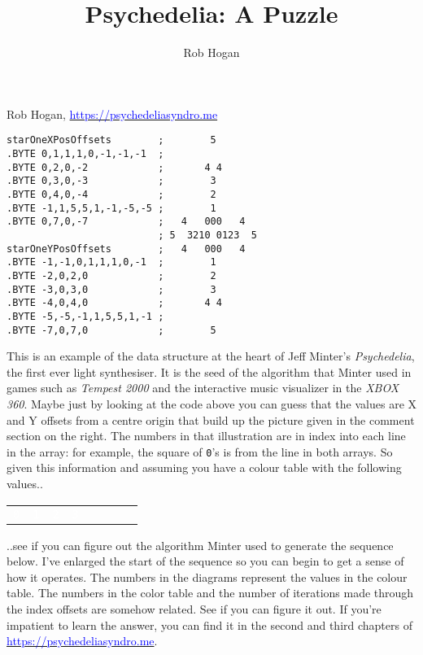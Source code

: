 \documentclass[pagedoutpaper,twocolumn,9pt]{pagedout}
\title{Psychedelia: A Puzzle}
\author{Rob Hogan}
\makeatletter
\newcommand*{\icode}[1]{{\texttt{#1}}}
\renewcommand{\maketitle}{
\begin{flushleft}
{\noindent\Huge\bf\@title}\break
\end{flushleft}
}
\makeatother
\begin{document}
    
\maketitle
\vspace{-0.8cm}
Rob Hogan, \href{https://github.com/mwenge/tempest}{\textcolor{blue}{https://psychedeliasyndro.me}}
\begin{lstlisting}[basicstyle=\ttfamily\small]
starOneXPosOffsets        ;        5       
.BYTE 0,1,1,1,0,-1,-1,-1  ;                
.BYTE 0,2,0,-2            ;       4 4                                       
.BYTE 0,3,0,-3            ;        3                                        
.BYTE 0,4,0,-4            ;        2                                        
.BYTE -1,1,5,5,1,-1,-5,-5 ;        1       
.BYTE 0,7,0,-7            ;   4   000   4                                   
                          ; 5  3210 0123  5                  
starOneYPosOffsets        ;   4   000   4  
.BYTE -1,-1,0,1,1,1,0,-1  ;        1                                        
.BYTE -2,0,2,0            ;        2                                        
.BYTE -3,0,3,0            ;        3                                        
.BYTE -4,0,4,0            ;       4 4      
.BYTE -5,-5,-1,1,5,5,1,-1 ;                                                 
.BYTE -7,0,7,0            ;        5       
\end{lstlisting}   
This is an example of the data structure at the heart of Jeff Minter's \textit{Psychedelia}, the
first ever light synthesiser. It is the seed of the algorithm that Minter used in games such as
\textit{Tempest 2000} and the interactive music visualizer in the \textit{XBOX 360}. Maybe just
by looking at the code above you can guess that the values are X and Y offsets from a centre origin
that build up the picture given in the comment section on the right. The numbers in that illustration
are in index into each line in the array: for example, the square of \icode{0}'s is from the line in
both arrays. So given this information and assuming you have a colour table with the following values..
\begin{adjustbox}{width=5cm,center}
  \begin{tabular}{cccccccc}
    \cellcolor[HTML]{000000}\textcolor{white}{\icode{0}} & \cellcolor{c64_blue}\textcolor{white}{\icode{1}} &
    \cellcolor{c64_red}\textcolor{white}{\icode{2}} & \cellcolor{c64_purple}\textcolor{white}{\icode{3}} &
    \cellcolor{c64_green}\icode{4} & \cellcolor{c64_cyan}\icode{5} &
    \cellcolor{c64_yellow}\icode{6} & \cellcolor{c64_white}\icode{7}  \\
  \end{tabular}
\end{adjustbox}
..see if you can figure out the algorithm Minter used to generate the sequence below. I've enlarged the 
start of the sequence so you can begin to get a sense of how it operates. The numbers in the diagrams
represent the values in the colour table. The numbers in the color table and the number of iterations
made through the index offsets are somehow related. See if you can figure it out.
If you're impatient to learn the answer, you can find it in the second and third chapters of 
\href{https://github.com/mwenge/tempest}{\textcolor{blue}{https://psychedeliasyndro.me}}.
\end{document}
